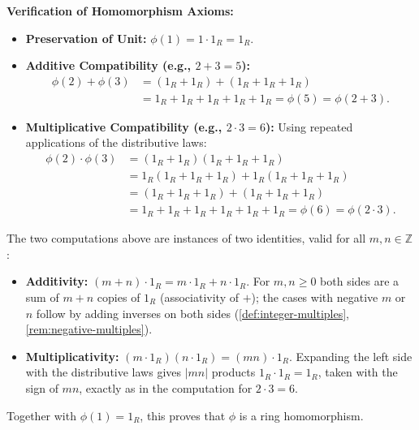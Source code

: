 \begin{content}

\textbf{Verification of Homomorphism Axioms:}
\begin{itemize}
    \item \textbf{Preservation of Unit:} $\phi(1) = 1 \cdot 1_R = 1_R$.
    \item \textbf{Additive Compatibility (e.g., $2 + 3 = 5$):}
    \begin{align*}
    \phi(2) + \phi(3) &= (1_R + 1_R) + (1_R + 1_R + 1_R) \\
    &= 1_R + 1_R + 1_R + 1_R + 1_R = \phi(5) = \phi(2 + 3).
    \end{align*}
    \item \textbf{Multiplicative Compatibility (e.g., $2 \cdot 3 = 6$):}
    Using repeated applications of the distributive laws:
    \begin{align*}
    \phi(2) \cdot \phi(3) &= (1_R + 1_R)(1_R + 1_R + 1_R) \\
    &= 1_R(1_R + 1_R + 1_R) + 1_R(1_R + 1_R + 1_R) \\
    &= (1_R + 1_R + 1_R) + (1_R + 1_R + 1_R) \\
    &= 1_R + 1_R + 1_R + 1_R + 1_R + 1_R = \phi(6) = \phi(2 \cdot 3).
    \end{align*}
\end{itemize}

\begin{steps}
The two computations above are instances of two identities, valid for all $m, n \in \mathbb{Z}$:
\begin{itemize}
    \item \textbf{Additivity:} $(m + n) \cdot 1_R = m \cdot 1_R + n \cdot 1_R$. For $m, n \ge 0$ both sides are a sum of $m + n$ copies of $1_R$ (associativity of $+$); the cases with negative $m$ or $n$ follow by adding inverses on both sides (\cref{def:integer-multiples}, \cref{rem:negative-multiples}).
    \item \textbf{Multiplicativity:} $(m \cdot 1_R)(n \cdot 1_R) = (mn) \cdot 1_R$. Expanding the left side with the distributive laws gives $|mn|$ products $1_R \cdot 1_R = 1_R$, taken with the sign of $mn$, exactly as in the computation for $2 \cdot 3 = 6$.
\end{itemize}
Together with $\phi(1) = 1_R$, this proves that $\phi$ is a ring homomorphism.
\end{steps}


\end{content}
